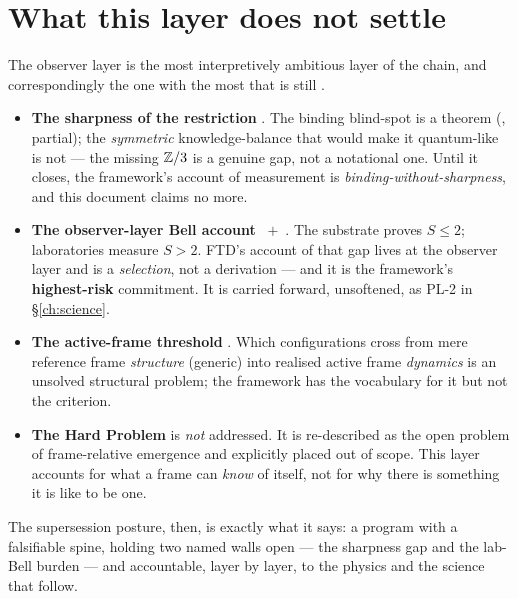 \section{What this layer does not settle}
\label{sec:phil-open}

The observer layer is the most interpretively ambitious layer of the chain, and
correspondingly the one with the most that is still .

\begin{itemize}[leftmargin=1.4em,itemsep=3pt,topsep=2pt]
  \item \textbf{The sharpness of the restriction} . The binding
    blind-spot is a theorem (, partial); the \emph{symmetric}
    knowledge-balance that would make it quantum-like is not --- the missing
    $\mathbb{Z}/3$ is a genuine gap, not a notational one. Until it closes, the
    framework's account of measurement is \emph{binding-without-sharpness}, and
    this document claims no more.
  \item \textbf{The observer-layer Bell account} ~$+$~. The
    substrate proves $S \le 2$; laboratories measure $S > 2$. FTD's account of
    that gap lives at the observer layer and is a \emph{selection}, not a
    derivation --- and it is the framework's \textbf{highest-risk} commitment.
    It is carried forward, unsoftened, as PL-2 in \S\ref{ch:science}.
  \item \textbf{The active-frame threshold} . Which configurations
    cross from mere reference frame \emph{structure} (generic) into realised
    active frame \emph{dynamics} is an unsolved structural problem; the
    framework has the vocabulary for it but not the criterion.
  \item \textbf{The Hard Problem} is \emph{not} addressed. It is re-described as
    the open problem of frame-relative emergence and explicitly placed out of
    scope. This layer accounts for what a frame can \emph{know} of itself, not
    for why there is something it is like to be one.
\end{itemize}

The supersession posture, then, is exactly what it says: a program with a
falsifiable spine, holding two named walls open --- the sharpness gap and the
lab-Bell burden --- and accountable, layer by layer, to the physics and the
science that follow.
